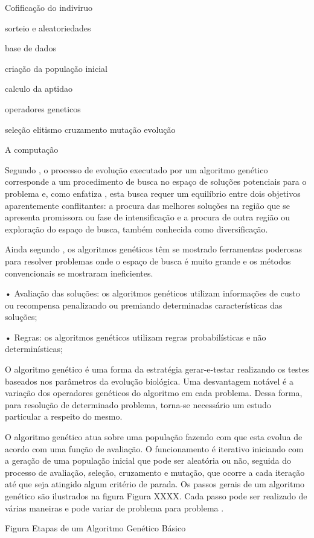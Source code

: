 \documentclass{abntpuc}
\begin{document}



Cofificação do indiviruo 

sorteio e aleatoriedades

base de dados

criação da população inicial

calculo da aptidao

operadores geneticos

seleção 
elitismo 
cruzamento
mutação
evolução



A computação 





Segundo \cite{oliveira2005algoritmo}, o processo de evolução executado por um algoritmo genético corresponde a um procedimento de busca no espaço de soluções potenciais para o problema e, como enfatiza \cite{michalewicz1996evolutionary}, esta busca requer um equilíbrio entre dois objetivos aparentemente conflitantes: a procura das melhores soluções na região que se apresenta promissora ou fase de intensificação e a procura de outra região ou exploração do espaço de busca, também conhecida como diversificação.\par

Ainda segundo \cite{oliveira2005algoritmo}, os algoritmos genéticos têm se mostrado ferramentas poderosas para resolver problemas onde o espaço de busca é muito grande e os métodos convencionais se mostraram ineficientes.\par


•  Avaliação das soluções: os algoritmos genéticos utilizam informações de custo ou recompensa penalizando ou premiando determinadas características das soluções; \par

•  Regras: os algoritmos genéticos utilizam regras probabilísticas e não determinísticas; \par

O algoritmo genético é uma forma da estratégia gerar-e-testar realizando os testes baseados nos parâmetros da evolução biológica. Uma desvantagem notável é a variação dos operadores genéticos do algoritmo em cada problema. Dessa forma, para resolução de determinado problema, torna-se necessário um estudo particular a respeito do mesmo. \par

O algoritmo genético atua sobre uma população fazendo com que esta evolua de acordo com uma função de avaliação. O funcionamento é iterativo iniciando com a geração de uma população inicial que pode ser aleatória ou não, seguida do processo de avaliação, seleção, cruzamento e mutação, que ocorre a cada iteração até que seja atingido algum critério de parada. Os passos gerais de um algoritmo genético são ilustrados na figura 
Figura XXXX. Cada passo pode ser realizado de várias maneiras e pode variar de problema para problema \cite{timoteo2005desenvolvimento}.\par 

Figura Etapas de um Algoritmo Genético Básico 

%
%
%
%
\end{document}
